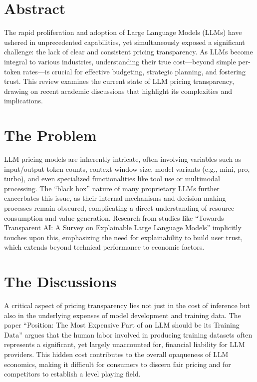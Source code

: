 

\section*{Abstract}
The rapid proliferation and adoption of Large Language Models (LLMs) have ushered in unprecedented capabilities, yet simultaneously exposed a significant challenge: the lack of clear and consistent pricing transparency. As LLMs become integral to various industries, understanding their true cost—beyond simple per-token rates—is crucial for effective budgeting, strategic planning, and fostering trust. This review examines the current state of LLM pricing transparency, drawing on recent academic discussions that highlight its complexities and implications.


\section{The Problem}
LLM pricing models are inherently intricate, often involving variables such as input/output token counts, context window size, model variants (e.g., mini, pro, turbo), and even specialized functionalities like tool use or multimodal processing. \cite{Buzby_2024}
The ``black box'' nature of many proprietary LLMs further exacerbates this issue, as their internal mechanisms and decision-making processes remain obscured, complicating a direct understanding of resource consumption and value generation. \cite{palikhe2025transparentaisurveyexplainable}
Research from studies like ``Towards Transparent AI: A Survey on Explainable Large Language Models'' implicitly touches upon this, emphasizing the need for explainability to build user trust, which extends beyond technical performance to economic factors.

\section{The Discussions}
A critical aspect of pricing transparency lies not just in the cost of inference but also in the underlying expenses of model development and training data. The paper ``Position: The Most Expensive Part of an LLM should be its Training Data'' \cite{kandpal2025positionexpensivellmtraining}
argues that the human labor involved in producing training datasets often represents a significant, yet largely unaccounted for, financial liability for LLM providers. This hidden cost contributes to the overall opaqueness of LLM economics, making it difficult for consumers to discern fair pricing and for competitors to establish a level playing field.

